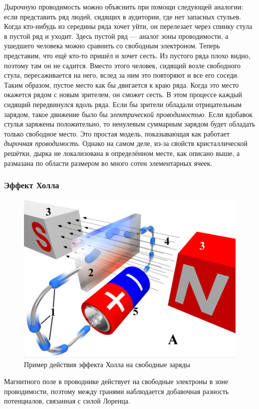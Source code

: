 \documentclass[a4paper, 12pt]{article}
\begin{document}
Дырочную проводимость можно объяснить при помощи следующей аналогии: если представить ряд людей, сидящих в аудитории, где нет запасных стульев. Когда кто-нибудь из середины ряда хочет уйти, он перелезает через спинку стула в пустой ряд и уходит. Здесь пустой ряд — аналог зоны проводимости, а ушедшего человека можно сравнить со свободным электроном.
Теперь представим, что ещё кто-то пришёл и хочет сесть. Из пустого ряда плохо видно, поэтому там он не садится. Вместо этого человек, сидящий возле свободного стула, пересаживается на него, вслед за ним это повторяют и все его соседи. Таким образом, пустое место как бы двигается к краю ряда. Когда это место окажется рядом с новым зрителем, он сможет сесть.
В этом процессе каждый сидящий передвинулся вдоль ряда. Если бы зрители обладали отрицательным зарядом, такое движение было бы  \textit{электрической проводимостью}. Если вдобавок стулья заряжены положительно, то ненулевым суммарным зарядом будет обладать только свободное место. Это простая модель, показывающая как работает \textit{дырочная проводимость}. Однако на самом деле, из-за свойств кристаллической решётки, дырка не локализована в определённом месте, как описано выше, а размазана по области размером во много сотен элементарных ячеек.

\subsubsection*{Эффект Холла}


\begin {figure}[H]
	\begin{center}
		\includegraphics[width = 0.6 \textwidth]{Hall_effect}
		\caption{Пример действия эффекта Холла на свободные заряды}
	\end{center}
\end {figure}


Магнитного поле в проводнике действует на свободные электроны в зоне проводимости, поэтому между гранями наблюдается добавочная разность потенциалов, связанная с силой Лоренца. 
\end{document}
